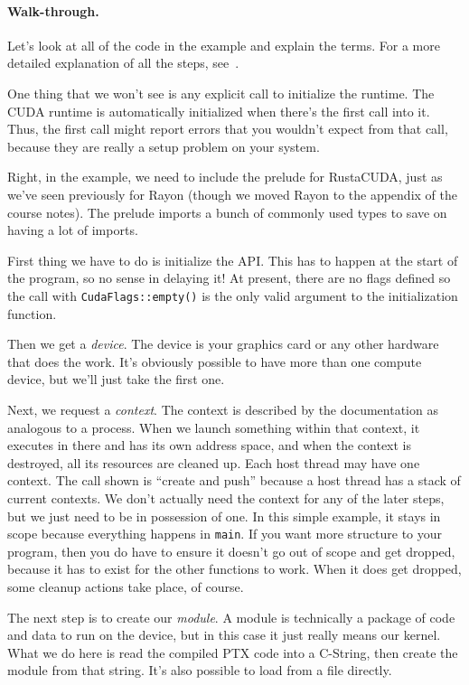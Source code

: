 \paragraph{Walk-through.} Let's look at all of the code in the example and
explain the terms. For a more detailed explanation of all the steps, see~\cite{cuda}.

One thing that we won't see is any explicit call to initialize the runtime. The CUDA runtime is automatically initialized when there's the first call into it. Thus, the first call might report errors that you wouldn't expect from that call, because they are really a setup problem on your system.

Right, in the example, we need to include the prelude for RustaCUDA, just as we've seen previously for Rayon (though we moved Rayon to the appendix of the course notes). The prelude imports a bunch of commonly used types to save on having a lot of imports. 

First thing we have to do is initialize the API. This has to happen at the start of the program, so no sense in delaying it! At present, there are no flags defined so the call with \texttt{CudaFlags::empty()} is the only valid argument to the initialization function. 

Then we get a \textit{device}. The device is your graphics card or any other hardware that does the work. It's obviously possible to have more than one compute device, but we'll just take the first one. 

Next, we request a \emph{context}. The context is described by the documentation as analogous to a process. When we launch something within that context, it executes in there and has its own address space, and when the context is destroyed, all its resources are cleaned up. Each host thread may have one context. The call shown is ``create and push'' because a host thread has a stack of current contexts. We don't actually need the context for any of the later steps, but we just need to be in possession of one. In this simple example, it stays in scope because everything happens in \texttt{main}. If you want more structure to your program, then you do have to ensure it doesn't go out of scope and get dropped, because it has to exist for the other functions to work. When it does get dropped, some cleanup actions take place, of course.

The next step is to create our \textit{module}. A module is technically a package of code and data to run on the device, but in this case it just really means our kernel. What we do here is read the compiled PTX code into a C-String, then create the module from that string. It's also possible to load from a file directly. 

